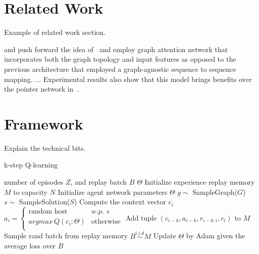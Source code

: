 \documentclass{article}
\begin{document}

\section{Related Work}

Example of related work section.

\cite{kool2018attention} and \cite{vaswani2017attention} push forward the idea of~\cite{bello2016neural} and 
employ graph attention network that incorporates both the graph topology and input features as opposed to the previous architecture 
that employed a graph-agnostic sequence to sequence mapping. ... Experimental results also 
show that this model brings benefits over the pointer network in~\cite{bello2016neural}. 


\section{Framework}

Explain the technical bits.

\begin{algorithm}[tb]
   \caption{k-step Q-learning}
   \label{alg:alg1}
\begin{algorithmic}
    number of episodes $Z$, and replay batch $B$
    $\Theta$
   \STATE Initialize experience replay memory $M$ to capacity $N$
   \STATE Initialize agent network parameters $\Theta$
   \STATE $g \sim$ SampleGraph($G$)
   \STATE $s \sim$ SampleSolution($S$)
   \STATE Compute the context vector $c_i$
   \STATE $a_i=\left\{\begin{array}{ll} 
                \text{random host} & w.p. \hspace{5pt} \epsilon \\
                argmax \hspace{2pt} Q(c_i;\Theta) & \text{otherwise}\\
                \end{array}
                \right.$
   \STATE Add tuple $(c_{i-k}, a_{i-k}, r_{i-k:i}, c_i)$ to $M$
   \ENDIF
   \STATE Sample rand batch from replay memory $B \overset{i.i.d}{\sim} M$
   \STATE Update $\Theta$ by Adam given the average loss over $B$
   \ENDFOR
   \ENDFOR
\end{algorithmic}
\end{algorithm}
\end{document}
